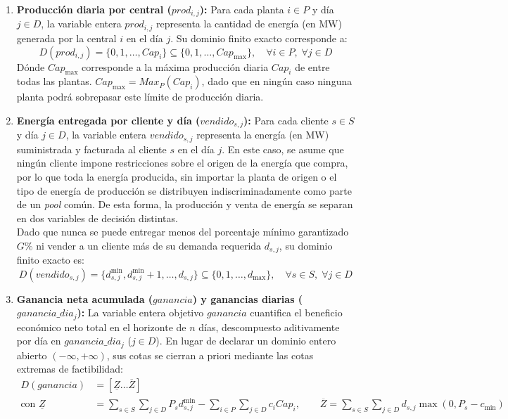 \begin{enumerate}
    \item \textbf{Producción diaria por central ($prod_{i,j}$):} Para cada planta $i \in P$ y día $j \in D$, la variable entera $prod_{i,j}$ representa la cantidad de energía (en $\text{MW}$) generada por la central $i$ en el día $j$. Su dominio finito exacto corresponde a:
    \begin{equation}
        D(prod_{i,j}) = \{0, 1, \dots, Cap_i\} \subseteq \{0, 1, \dots, Cap_{\max}\}, \quad \forall i \in P, \; \forall j \in D
        \label{eq:dom_prod}
    \end{equation}
    Dónde $Cap_{\max}$ corresponde a la máxima producción diaria $Cap_i$ de entre todas las plantas. $Cap_{\max}=Max_P(Cap_i)$, dado que en ningún caso ninguna planta podrá sobrepasar este límite de producción diaria.\\
    
    \item \textbf{Energía entregada por cliente y día ($vendido_{s,j}$):} Para cada cliente $s \in S$ y día $j \in D$, la variable entera $vendido_{s,j}$ representa la energía (en $\text{MW}$) suministrada y facturada al cliente $s$ en el día $j$. En este caso, se asume que ningún cliente impone restricciones sobre el origen de la energía que compra, por lo que toda la energía producida, sin importar la planta de origen o el tipo de energía de producción se distribuyen indiscriminadamente como parte de un \textit{pool} común. De esta forma, la producción y venta de energía se separan en dos variables de decisión distintas.\\
    
    Dado que nunca se puede entregar menos del porcentaje mínimo garantizado $G\%$ ni vender a un cliente más de su demanda requerida $d_{s,j}$, su dominio finito exacto es:
    \begin{equation}
        D(vendido_{s,j}) = \{d^{\min}_{s,j}, d^{\min}_{s,j} + 1, \dots, d_{s,j}\} \subseteq \{0, 1, \dots, d_{\max}\}, \quad \forall s \in S, \; \forall j \in D
        \label{eq:dom_vendido}
    \end{equation}

    \item \textbf{Ganancia neta acumulada ($ganancia$) y ganancias diarias ($ganancia\_dia_j$):} La variable entera objetivo $ganancia$ cuantifica el beneficio económico neto total en el horizonte de $n$ días, descompuesto aditivamente por día en $ganancia\_dia_j$ ($j \in D$). En lugar de declarar un dominio entero abierto $(-\infty, +\infty)$, sus cotas se cierran a priori mediante las cotas extremas de factibilidad:
    \begin{align}
        D(ganancia) &= [\underline{Z} \dots \overline{Z}] \label{eq:dom_ganancia} \\
        \text{con }\underline{Z} &= \sum_{s \in S}\sum_{j \in D} P_s d^{\min}_{s,j} - \sum_{i \in P}\sum_{j \in D} c_i Cap_i, \qquad
        \overline{Z} = \sum_{s \in S}\sum_{j \in D} d_{s,j}\max(0, P_s - c_{\min}) \nonumber
    \end{align}
\end{enumerate}

